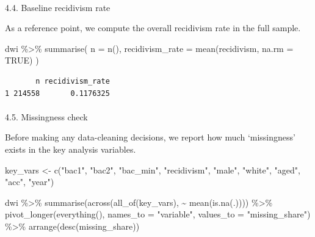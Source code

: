 \documentclass[
  letterpaper,
  DIV=11,
  numbers=noendperiod]{scrartcl}
\makeatletter
\let\oldparagraph\paragraph
\renewcommand{\paragraph}{
    \@ifstar
      \xxxParagraphStar
      \xxxParagraphNoStar
  }
\newcommand{\xxxParagraphStar}[1]{\oldparagraph*{#1}\mbox{}}
\newcommand{\xxxParagraphNoStar}[1]{\oldparagraph{#1}\mbox{}}
\newenvironment{Shaded}{\begin{snugshade}}{\end{snugshade}}
\newcommand{\AttributeTok}[1]{\textcolor[rgb]{0.40,0.45,0.13}{#1}}
\newcommand{\ConstantTok}[1]{\textcolor[rgb]{0.56,0.35,0.01}{#1}}
\newcommand{\FunctionTok}[1]{\textcolor[rgb]{0.28,0.35,0.67}{#1}}
\newcommand{\NormalTok}[1]{\textcolor[rgb]{0.00,0.23,0.31}{#1}}
\newcommand{\OtherTok}[1]{\textcolor[rgb]{0.00,0.23,0.31}{#1}}
\newcommand{\SpecialCharTok}[1]{\textcolor[rgb]{0.37,0.37,0.37}{#1}}
\newcommand{\StringTok}[1]{\textcolor[rgb]{0.13,0.47,0.30}{#1}}
\makeatother
\begin{document}
\paragraph{4.4. Baseline recidivism
rate}\label{baseline-recidivism-rate}

As a reference point, we compute the overall recidivism rate in the full
sample.

\begin{Shaded}
\begin{Highlighting}[]
\NormalTok{dwi }\SpecialCharTok{\%\textgreater{}\%}
  \FunctionTok{summarise}\NormalTok{(}
    \AttributeTok{n =} \FunctionTok{n}\NormalTok{(),}
    \AttributeTok{recidivism\_rate =} \FunctionTok{mean}\NormalTok{(recidivism, }\AttributeTok{na.rm =} \ConstantTok{TRUE}\NormalTok{)}
\NormalTok{  )}
\end{Highlighting}
\end{Shaded}

\begin{verbatim}
       n recidivism_rate
1 214558       0.1176325
\end{verbatim}

\paragraph{4.5. Missingness check}\label{missingness-check}

Before making any data-cleaning decisions, we report how much
`missingness' exists in the key analysis variables.

\begin{Shaded}
\begin{Highlighting}[]
\NormalTok{key\_vars }\OtherTok{\textless{}{-}} \FunctionTok{c}\NormalTok{(}\StringTok{"bac1"}\NormalTok{, }\StringTok{"bac2"}\NormalTok{, }\StringTok{"bac\_min"}\NormalTok{, }\StringTok{"recidivism"}\NormalTok{, }\StringTok{"male"}\NormalTok{, }\StringTok{"white"}\NormalTok{, }\StringTok{"aged"}\NormalTok{, }\StringTok{"acc"}\NormalTok{, }\StringTok{"year"}\NormalTok{)}

\NormalTok{dwi }\SpecialCharTok{\%\textgreater{}\%}
  \FunctionTok{summarise}\NormalTok{(}\FunctionTok{across}\NormalTok{(}\FunctionTok{all\_of}\NormalTok{(key\_vars), }\SpecialCharTok{\textasciitilde{}} \FunctionTok{mean}\NormalTok{(}\FunctionTok{is.na}\NormalTok{(.)))) }\SpecialCharTok{\%\textgreater{}\%}
  \FunctionTok{pivot\_longer}\NormalTok{(}\FunctionTok{everything}\NormalTok{(), }\AttributeTok{names\_to =} \StringTok{"variable"}\NormalTok{, }\AttributeTok{values\_to =} \StringTok{"missing\_share"}\NormalTok{) }\SpecialCharTok{\%\textgreater{}\%}
  \FunctionTok{arrange}\NormalTok{(}\FunctionTok{desc}\NormalTok{(missing\_share))}
\end{Highlighting}
\end{Shaded}
\end{document}
